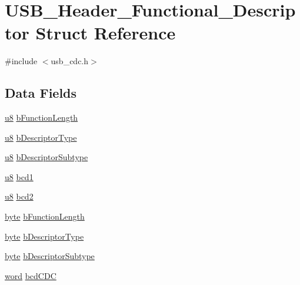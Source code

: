\hypertarget{struct_u_s_b___header___functional___descriptor}{\section{U\-S\-B\-\_\-\-Header\-\_\-\-Functional\-\_\-\-Descriptor Struct Reference}
\label{struct_u_s_b___header___functional___descriptor}
}


{\ttfamily \#include $<$usb\-\_\-cdc.\-h$>$}

\subsection*{Data Fields}
\begin{DoxyCompactItemize}
\item 
\hyperlink{p8_2pinguino_2core_2typedef_8h_aed742c436da53c1080638ce6ef7d13de}{u8} \hyperlink{struct_u_s_b___header___functional___descriptor_a26c0bc44674a4154a958ce07a0d5b0fd}{b\-Function\-Length}
\item 
\hyperlink{p8_2pinguino_2core_2typedef_8h_aed742c436da53c1080638ce6ef7d13de}{u8} \hyperlink{struct_u_s_b___header___functional___descriptor_af6d6c7e334878414c973fc10e54cfb4e}{b\-Descriptor\-Type}
\item 
\hyperlink{p8_2pinguino_2core_2typedef_8h_aed742c436da53c1080638ce6ef7d13de}{u8} \hyperlink{struct_u_s_b___header___functional___descriptor_a647561cc46bc5a0d3e0d9e962c43c605}{b\-Descriptor\-Subtype}
\item 
\hyperlink{p8_2pinguino_2core_2typedef_8h_aed742c436da53c1080638ce6ef7d13de}{u8} \hyperlink{struct_u_s_b___header___functional___descriptor_ae66728fcd4b92b9f339d30cd96eb53d1}{bcd1}
\item 
\hyperlink{p8_2pinguino_2core_2typedef_8h_aed742c436da53c1080638ce6ef7d13de}{u8} \hyperlink{struct_u_s_b___header___functional___descriptor_ab9350b3e1d0773cc36278d17a911f4a3}{bcd2}
\item 
\hyperlink{p8_2pinguino_2core_2typedef_8h_a0c8186d9b9b7880309c27230bbb5e69d}{byte} \hyperlink{struct_u_s_b___header___functional___descriptor_a2d45c545dca79b1a912a7fa0e8d3a691}{b\-Function\-Length}
\item 
\hyperlink{p8_2pinguino_2core_2typedef_8h_a0c8186d9b9b7880309c27230bbb5e69d}{byte} \hyperlink{struct_u_s_b___header___functional___descriptor_a0b4dacbe8b9cc6e176f298a4fe7bbd39}{b\-Descriptor\-Type}
\item 
\hyperlink{p8_2pinguino_2core_2typedef_8h_a0c8186d9b9b7880309c27230bbb5e69d}{byte} \hyperlink{struct_u_s_b___header___functional___descriptor_a8ad9638618bb89c49f9c1490311ab1d5}{b\-Descriptor\-Subtype}
\item 
\hyperlink{p8_2pinguino_2core_2typedef_8h_abad51e07ab6d26bec9f1f786c8d65bcd}{word} \hyperlink{struct_u_s_b___header___functional___descriptor_a09fd31ebbad300f5c9686156363a5438}{bcd\-C\-D\-C}
\end{DoxyCompactItemize}


